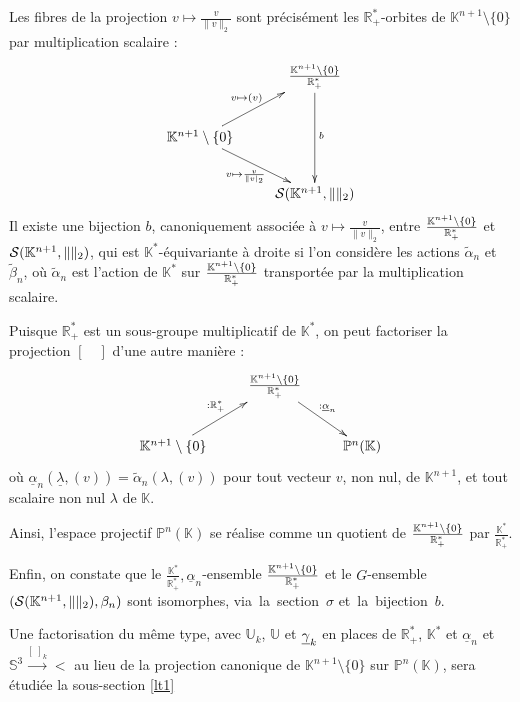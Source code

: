 \begin{rema}
Les fibres de la projection $v\mapsto\frac{v}{\|v\|_2}$ sont pr\'ecis\'ement %
les $\mathbb{R}_+^{\ast}$-orbites de $\mathbb{K}^{n+1}\setminus\{0\}$ par multiplication scalaire :
\[\xymatrix{&\Qr \ar[dd]^{b} \\
\mathbb{K}^{n+1}\setminus\{0\} \ar[ru]^{v\mapsto (v)} \ar[rd]_{v\mapsto\frac{v}{\|v|_2}} \\
& \Sk{K}
}\]
Il existe une bijection $b$, canoniquement associ\'ee \`a $v\mapsto\frac{v}{\|v\|_2}$, %
entre $\frac{\mathbb{K}^{n+1}\setminus\{0\}}{\mathbb{R}_+^{\ast}}$ et $\mathcal{S}(\mathbb{K}^{n+1},\|\|_2)$, %
qui est $\mathbb{K}^{\ast}$-\'equivariante \`a droite si l'on consid\`ere les actions $\tilde{\alpha}_n$ et $\tilde{\beta}_n$, %
o\`u $\tilde{\alpha}_n$ est l'action de $\mathbb{K}^{\ast}$ sur $\frac{\mathbb{K}^{n+1}\setminus\{0\}}{\mathbb{R}_+^{\ast}}$ transport\'ee par la multiplication scalaire.

\medskip
Puisque $\mathbb{R}_+^{\ast}$ est un sous-groupe multiplicatif de $\mathbb{K}^{\ast}$, on peut factoriser la projection $[\quad]$ d'une autre mani\`ere :
\[
\xymatrix{ & \Qr \ar[rd]^{: \underline{\alpha}_n} \\%
\mathbb{K}^{n+1}\setminus\{0\} \ar[ru]^{: \mathbb{R}_+^{\ast}} & & \mathbb{P}^n(\mathbb{K})
}
\]
o\`u $\underline{\alpha}_n (\underline{\lambda},(v))=\tilde{\alpha}_n (\lambda ,(v))$ %
pour tout vecteur $v$, non nul, de $\mathbb{K}^{n+1}$, et tout scalaire non nul $\lambda$ de $\mathbb{K}$.
\par
Ainsi, l'espace projectif $\mathbb{P}^n(\mathbb{K})$ se r\'ealise comme un quotient de $\frac{\mathbb{K}^{n+1}\setminus\{0\}}{\mathbb{R}_+^{\ast}}$ %
par $\frac{\mathbb{K}^{\ast}}{\mathbb{R}_+^{\ast}}$.

\medskip
Enfin, on constate que le $\frac{\mathbb{K}^{\ast}}{\mathbb{R}_+^{\ast}},\underline{\alpha}_n$-ensemble $\frac{\mathbb{K}^{n+1}\setminus\{0\}}{\mathbb{R}_+^{\ast}}$ %
et le $G$-ensemble $(\mathcal{S}(\mathbb{K}^{n+1},\|\|_2),\beta_n)$ %
sont isomorphes, via~la~section~$\sigma$ et~la~bijection~$b$.
\par
Une factorisation du m\^eme type, avec $\mathbb{U}_k$, $\mathbb{U}$ et $\underline{\gamma}_{k}$ en places de $\mathbb{R}_+^{\ast}$, $\mathbb{K}^{\ast}$ et $\underline{\alpha}_n$%
et $\mathbb{S}^3\xrightarrow{[\; ]_k}\lt$ au lieu de la projection canonique de $\mathbb{K}^{n+1}\setminus\{0\}$ sur $\mathbb{P}^n(\mathbb{K})$, sera \'etudi\'ee  la sous-section \ref{lt1}
\end{rema}

